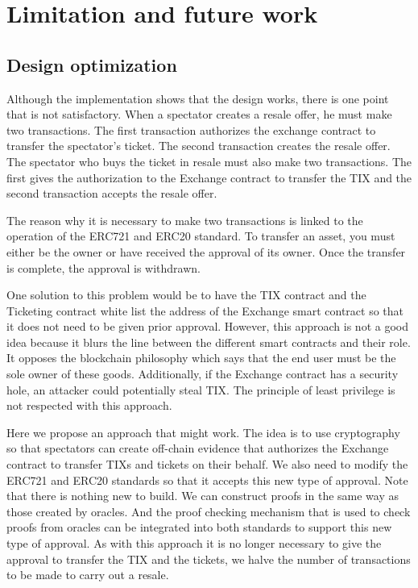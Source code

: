 \documentclass[a4paper,11pt,oneside]{report}
\begin{document}
\chapter{Limitation and future work}

\section{Design optimization}
Although the implementation shows that the design works, there is one point that is not satisfactory. When a spectator creates a resale offer, he must make two transactions. The first transaction authorizes the exchange contract to transfer the spectator's ticket. The second transaction creates the resale offer. The spectator who buys the ticket in resale must also make two transactions. The first gives the authorization to the Exchange contract to transfer the TIX and the second transaction accepts the resale offer.

The reason why it is necessary to make two transactions is linked to the operation of the ERC721 and ERC20 standard. To transfer an asset, you must either be the owner or have received the approval of its owner. Once the transfer is complete, the approval is withdrawn.

One solution to this problem would be to have the TIX contract and the Ticketing contract white list the address of the Exchange smart contract so that it does not need to be given prior approval.
However, this approach is not a good idea because it blurs the line between the different smart contracts and their role. It opposes the blockchain philosophy which says that the end user must be the sole owner of these goods. Additionally, if the Exchange contract has a security hole, an attacker could potentially steal TIX. The principle of least privilege is not respected with this approach.

Here we propose an approach that might work. The idea is to use cryptography so that spectators can create off-chain evidence that authorizes the Exchange contract to transfer TIXs and tickets on their behalf. We also need to modify the ERC721 and ERC20 standards so that it accepts this new type of approval. Note that there is nothing new to build. We can construct proofs in the same way as those created by oracles. And the proof checking mechanism that is used to check proofs from oracles can be integrated into both standards to support this new type of approval. As with this approach it is no longer necessary to give the approval to transfer the TIX and the tickets, we halve the number of transactions to be made to carry out a resale.
\end{document}
